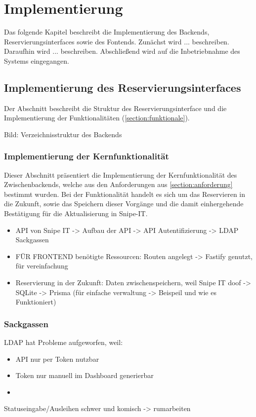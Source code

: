 
\chapter{Implementierung}
\label{chapter-implementierung}
Das folgende Kapitel beschreibt die Implementierung des Backends, Reservierungsinterfaces sowie des
Fontends. Zunächst wird ... beschreiben. Daraufhin wird ... beschreiben. Abschließend wird auf die
Inbetriebnahme des Systems eingegangen.


\section{Implementierung des Reservierungsinterfaces}
Der Abschnitt beschreibt die Struktur des Reservierungsinterface und die Implementierung der
Funktionalitäten (\ref{section:funktionale}).  

Bild: Verzeichnisstruktur des Backends

\subsection{Implementierung der Kernfunktionalität}
Dieser Abschnitt präsentiert die Implementierung der Kernfunktionalität des Zwischenbackends,
welche aus den Anforderungen aus \ref{section:anforderung} bestimmt wurden. Bei der Funktionalität
handelt es sich um das Reservieren in die Zukunft, sowie das Speichern dieser Vorgänge und die
damit einhergehende Bestätigung für die Aktualisierung in Snipe-IT.
\begin{itemize}
  \item API von Snipe IT -> Aufbau der API -> API Autentifizierung -> LDAP Sackgassen
  \item FÜR FRONTEND benötigte Ressourcen: Routen angelegt -> Fastify genutzt, für vereinfachung
  \item Reservierung in der Zukunft: Daten zwischenspeichern, weil Snipe IT doof -> SQLite -> Prisma
  (für einfache verwaltung -> Beispeil und wie es Funktioniert) 
\end{itemize}


\subsection{Sackgassen}
LDAP hat Probleme aufgeworfen, weil:

\begin{itemize}
  \item API nur per Token nutzbar
  \item Token nur manuell im Dashboard generierbar
  \item
\end{itemize}
Statuseingabe/Ausleihen schwer und komisch -> rumarbeiten

